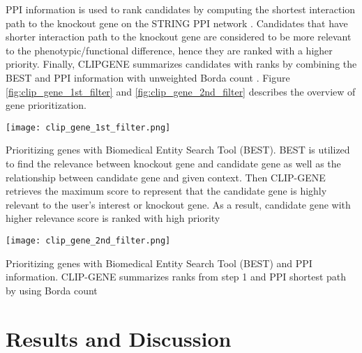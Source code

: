 \documentclass[oneside,phd]{snuthesis}
\begin{document}
PPI information is used to rank candidates by computing the shortest interaction path to the knockout gene on the STRING PPI network \citep{szklarczyk2010string}. 
Candidates that have shorter interaction path to the knockout gene are considered to be more relevant to the phenotypic/functional difference, hence
they are ranked with a higher priority. 
Finally, CLIPGENE summarizes candidates with ranks by combining
the BEST and PPI information with unweighted Borda count \citep{10.2307/227640}. 
Figure \ref{fig:clip_gene_1st_filter} and \ref{fig:clip_gene_2nd_filter} describes the overview of gene prioritization.

\begin{figure*}
\begin{center}
\texttt{[image: clip\_gene\_1st\_filter.png]}
\end{center}
\caption{Gene selection and ranking process \citep{hur2016clip}}
\scriptsize{Prioritizing genes with Biomedical Entity Search Tool (BEST). BEST is utilized to find the relevance between knockout gene
and candidate gene as well as the relationship between candidate gene and given context. Then CLIP-GENE retrieves the maximum score to
represent that the candidate gene is highly relevant to the user’s interest or knockout gene. As a result, candidate gene with higher relevance score
is ranked with high priority}
\label{fig:clip_gene_1st_filter}
\end{figure*}


\begin{figure*}
\begin{center}
\texttt{[image: clip\_gene\_2nd\_filter.png]}
\end{center}
\caption{Gene ranking process \citep{hur2016clip}}
\scriptsize{Prioritizing genes with Biomedical Entity Search Tool (BEST) and PPI information. CLIP-GENE summarizes ranks from step 1 and PPI shortest path by using Borda count}
\label{fig:clip_gene_2nd_filter}
\end{figure*}


\section{Results and Discussion}
\end{document}

